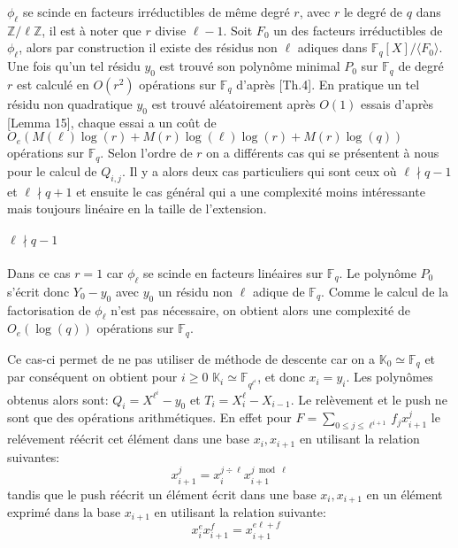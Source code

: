 \documentclass[10pt,a4paper]{book}
\theoremstyle{plain}
\theoremstyle{definition}
\theoremstyle{definition}
\theoremstyle{definition}
\theoremstyle{definition}
\theoremstyle{remark}
\theoremstyle{remark}
\begin{document}
$\phi_{\ell}$ se scinde en facteurs irréductibles de même degré $r$, avec $r$ le degré de $q$ dans $\mathbb{Z}/\ell \mathbb{Z}$, il est à noter que $r$ divise $\ell-1$. Soit $F_0$ un des facteurs irréductibles de $\phi_{\ell}$, alors par construction il existe des résidus non $\ell$ adiques dans $\mathbb{F}_q[X]/\langle F_0 \rangle$. Une fois qu'un tel résidu $y_0$ est trouvé son polynôme minimal $P_0$ sur $\mathbb{F}_q$ de degré $r$ est calculé en $O(r^2)$ opérations sur $\mathbb{F}_q$ d'après \cite{Shoup93}[Th.4]. 
En pratique un tel résidu non quadratique $y_0$ est trouvé aléatoirement après $O(1)$ essais d'après \cite{Shoup93}[Lemma 15], chaque essai a un coût de $O_e(M(\ell)\log(r)+M(r)\log(\ell)\log(r)+M(r)\log(q))$ opérations sur $\mathbb{F}_q$.
Selon l'ordre de $r$ on a différents cas qui se présentent à nous pour le calcul de $Q_{i,j}$. Il y a alors deux cas particuliers qui sont ceux où $\ell \nmid q-1$ et $\ell \nmid q+1$ et ensuite le cas général qui a une complexité moins intéressante mais toujours linéaire en la taille de l'extension.

\paragraph{$\ell \nmid q-1$}
Dans ce cas $r=1$ car $\phi_{\ell}$ se scinde en facteurs linéaires sur $\mathbb{F}_q$. Le polynôme $P_0$ s'écrit donc $Y_0-y_0$ avec $y_0$ un résidu non $\ell$ adique de $\mathbb{F}_q$. Comme le calcul de la factorisation de $\phi_{\ell}$ n'est pas nécessaire, on obtient alors une complexité de $O_e(\log(q))$ opérations sur $\mathbb{F}_q$.

Ce cas-ci permet de ne pas utiliser de méthode de descente car on a $\mathbb{K}_0 \simeq \mathbb{F}_q$ et par conséquent on obtient pour $i \geqslant 0 $   $\mathbb{K}_i \simeq \mathbb{F}_{q^{\ell^i}}$, et donc $x_i=y_i$. Les polynômes obtenus alors sont: $Q_i=X^{\ell^i}-y_0$ et $T_i=X_i^{\ell}-X_{i-1}$. Le relèvement et le push ne sont que des opérations arithmétiques. En effet pour $F=\sum_{0 \leqslant j \leqslant \ell^{i+1}}f_jx_{i+1}^j$ le relévement réécrit cet élément dans une base $x_i,x_{i+1}$ en utilisant la relation suivantes:
\begin{equation*}
x_{i+1}^j=x_i^{j \div \ell}x_{i+1}^{j \bmod \ell} 
\end{equation*}
tandis que le push réécrit un élément écrit dans une base $x_i, x_{i+1}$ en un élément exprimé dans la base $x_{i+1}$ en utilisant la relation suivante:
\begin{equation*}
\quad x_i^ex_{i+1}^f=x_{i+1}^{e\ell + f} 
\end{equation*}
\end{document}
